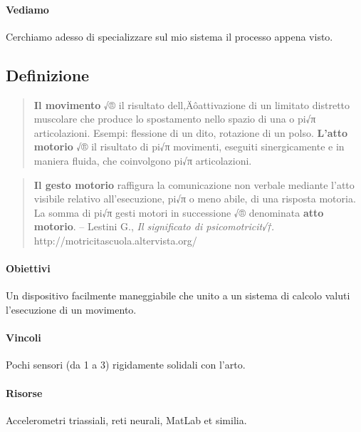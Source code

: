 \paragraph{Vediamo}
Cerchiamo adesso di specializzare sul mio sistema il processo appena visto.

	\subsection{Definizione}

\begin{quotation}
	\textbf{Il movimento} √® il risultato dell‚Äôattivazione
	di un limitato distretto muscolare che produce lo spostamento nello spazio
	di una o pi√π articolazioni.
	Esempi: \alert{flessione di un dito}, rotazione di un polso.
	\textbf{L'atto motorio} √® il \alert{risultato di pi√π movimenti},
	eseguiti sinergicamente e in maniera fluida, che coinvolgono pi√π articolazioni. 
\end{quotation} \cite{cit:mandolesi}

\begin{quotation}
	\textbf{Il gesto motorio} raffigura la comunicazione non verbale
	mediante l'atto visibile relativo all'esecuzione,
	pi√π o meno abile, di una risposta motoria.
	La somma di pi√π gesti motori in successione √® denominata \textbf{atto motorio}.
	-- Lestini G., \emph{Il significato di psicomotricit√†.} http://motricitascuola.altervista.org/
\end{quotation} \cite{cit:lestini}


	\paragraph{Obiettivi}
	Un dispositivo facilmente maneggiabile
	che unito a un sistema di calcolo
	valuti l'esecuzione di un movimento.

	\paragraph{Vincoli}
	Pochi sensori (da 1 a 3) rigidamente solidali con l'arto.
	
	\paragraph{Risorse}
	Accelerometri triassiali, reti neurali, MatLab et similia.
	
